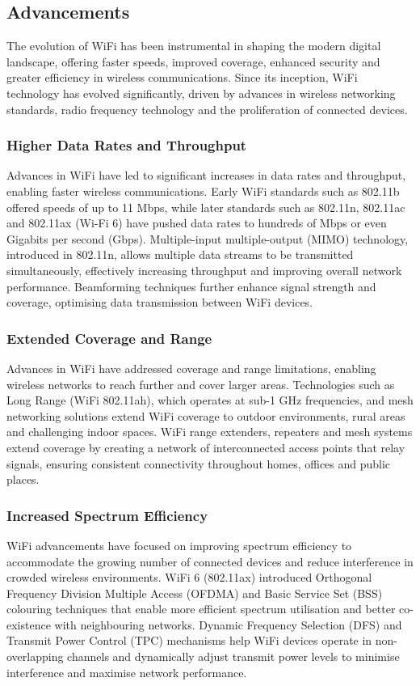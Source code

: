 \subsection{Advancements}
The evolution of WiFi has been instrumental in shaping the modern digital landscape, offering faster speeds, improved coverage, enhanced security and greater efficiency in wireless communications. Since its inception, WiFi technology has evolved significantly, driven by advances in wireless networking standards, radio frequency technology and the proliferation of connected devices.

\subsubsection{Higher Data Rates and Throughput}
Advances in WiFi have led to significant increases in data rates and throughput, enabling faster wireless communications. Early WiFi standards such as 802.11b offered speeds of up to 11 Mbps, while later standards such as 802.11n, 802.11ac and 802.11ax (Wi-Fi 6) have pushed data rates to hundreds of Mbps or even Gigabits per second (Gbps). Multiple-input multiple-output (MIMO) technology, introduced in 802.11n, allows multiple data streams to be transmitted simultaneously, effectively increasing throughput and improving overall network performance. Beamforming techniques further enhance signal strength and coverage, optimising data transmission between WiFi devices.

\subsubsection{Extended Coverage and Range}
Advances in WiFi have addressed coverage and range limitations, enabling wireless networks to reach further and cover larger areas. Technologies such as Long Range (WiFi 802.11ah), which operates at sub-1 GHz frequencies, and mesh networking solutions extend WiFi coverage to outdoor environments, rural areas and challenging indoor spaces. WiFi range extenders, repeaters and mesh systems extend coverage by creating a network of interconnected access points that relay signals, ensuring consistent connectivity throughout homes, offices and public places.

\subsubsection{Increased Spectrum Efficiency}
WiFi advancements have focused on improving spectrum efficiency to accommodate the growing number of connected devices and reduce interference in crowded wireless environments. WiFi 6 (802.11ax) introduced Orthogonal Frequency Division Multiple Access (OFDMA) and Basic Service Set (BSS) colouring techniques that enable more efficient spectrum utilisation and better co-existence with neighbouring networks. Dynamic Frequency Selection (DFS) and Transmit Power Control (TPC) mechanisms help WiFi devices operate in non-overlapping channels and dynamically adjust transmit power levels to minimise interference and maximise network performance.


